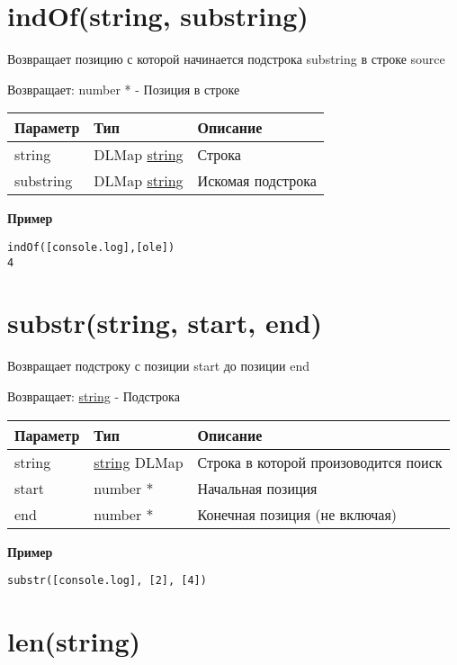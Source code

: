 \hypertarget{indofstring-substring-number}{%
\section{indOf(string, substring)}\label{indofstring-substring-number}}

Возвращает позицию с которой начинается подстрока substring в строке
source

Возвращает: number \textbar{} * - Позиция в строке

\begin{longtable}[]{@{}lll@{}}
\toprule
Параметр & Тип & Описание\tabularnewline
\midrule
\endhead
string & DLMap \textbar{} \protect\hyperlink{string}{string} &
Строка\tabularnewline
substring & DLMap \textbar{} \protect\hyperlink{string}{string} &
Искомая подстрока\tabularnewline
\bottomrule
\end{longtable}

\textbf{Пример}

\begin{verbatim}
indOf([console.log],[ole])
4
\end{verbatim}

\hypertarget{substrstring-start-end-string}{%
\section{substr(string, start, end)}\label{substrstring-start-end-string}}

Возвращает подстроку с позиции start до позиции end

Возвращает: \protect\hyperlink{string}{string} - Подстрока

\begin{longtable}[]{@{}lll@{}}
\toprule
Параметр & Тип & Описание\tabularnewline
\midrule
\endhead
string & \protect\hyperlink{string}{string} \textbar{} DLMap & Строка в
которой произоводится поиск\tabularnewline
start & number \textbar{} * & Начальная позиция\tabularnewline
end & number \textbar{} * & Конечная позиция (не включая)\tabularnewline
\bottomrule
\end{longtable}

\textbf{Пример}

\begin{verbatim}
substr([console.log], [2], [4])
\end{verbatim}

\hypertarget{lenstring-number}{%
\section{len(string)}\label{lenstring-number}}

